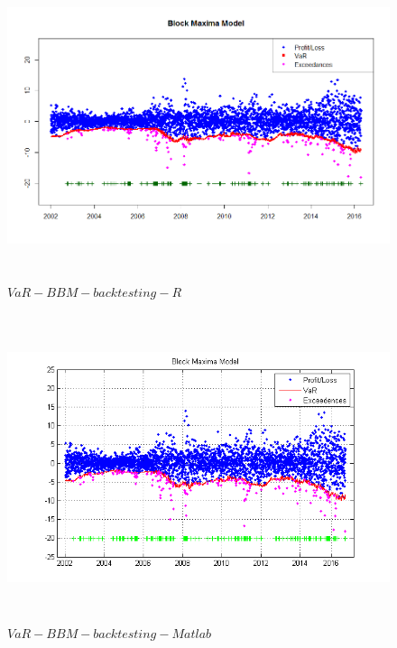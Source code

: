 \documentclass[a4paper,11pt]{article}
\begin{document}
\begin{flushleft}
\begin{figure}[htpb!]
      \centering
      \includegraphics[width=12cm,height=9cm]{VaR_BBM_backtesting_R.png}
      \caption{$VaR-BBM-backtesting-R$}
\end{figure}
\begin{figure}[htpb!]
        \centering
        \includegraphics[width=12cm,height=9cm]{VaR_BBM_backtesting_Matlab.png}
        \caption{$VaR-BBM-backtesting-Matlab$}
\end{figure}
\end{flushleft}
\end{document}
